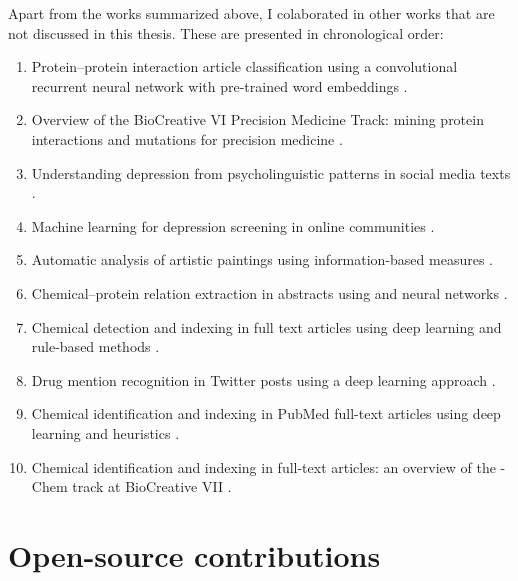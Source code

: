 Apart from the works summarized above, I colaborated in other works that are not discussed in this thesis.
These are presented in chronological order:

\begin{enumerate}

\item
Protein--protein interaction article classification using a convolutional recurrent neural network with pre-trained word embeddings \parencite{matos2017b}.

\item
Overview of the BioCreative VI Precision Medicine Track: mining protein interactions and mutations for precision medicine \parencite{dogan2019a}.

\item
Understanding depression from psycholinguistic patterns in social media texts \parencite{trifan2020a}.

\item
Machine learning for depression screening in online communities \parencite{trifan2020b}.

\item
Automatic analysis of artistic paintings using information-based measures \parencite{silva2021a}.

\item
Chemical--protein relation extraction in  abstracts using  and neural networks \parencite{antunes2021a}.

\item
Chemical detection and indexing in  full text articles using deep learning and rule-based methods \parencite{almeida2021a}.

\item
Drug mention recognition in Twitter posts using a deep learning approach \parencite{silva2021b}.

\item
Chemical identification and indexing in PubMed full-text articles using deep learning and heuristics \parencite{almeida2022a}.

\item
Chemical identification and indexing in full-text articles: an overview of the -Chem track at BioCreative VII \parencite{leaman2023a}.

\end{enumerate}


\section{Open-source contributions}

